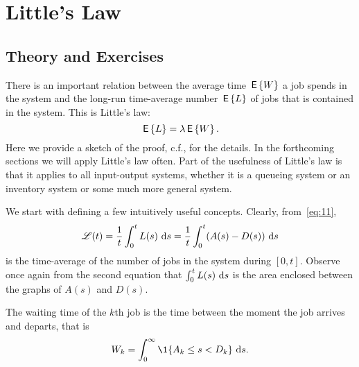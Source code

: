 \section{Little's Law}
\label{sec:littles-law}

\subsection*{Theory and Exercises}



There is an important relation between the average time $\,\mathsf{E}\left\{W\right\}$ a job
spends in the system and the long-run time-average number $\,\mathsf{E}\left\{L\right\}$ of jobs
that is contained in the system. This is Little's law:
\begin{equation}
  \,\mathsf{E}\left\{L\right\} = \lambda \,\mathsf{E}\left\{W\right\}.
\end{equation}
Here we provide a sketch of the proof, c.f.,
\cite{el-taha98:_sampl_path_analy_queuein_system} for the details. In
the forthcoming sections we will apply Little's law often. Part of the
usefulness of Little's law is that it applies to all input-output
systems, whether it is a queueing system or an inventory system or
some much more general system.

We start with defining a few intuitively useful concepts.  Clearly, from~\eqref{eq:11}, 
\begin{equation*}
  \mathscr{L}(t) = \frac 1 t\int_0^t L(s)\, \,\text{d}s =  \frac 1 t\int_0^t (A(s)-D(s)) \, \,\text{d}s
\end{equation*}
is the time-average of the number of jobs in the system during
$[0,t]$. Observe once again from the second equation that
$\int_0^t L(s)\,\,\text{d}s$ is the area enclosed between the graphs of $A(s)$
and $D(s)$.


The waiting time of the $k$th job is the time between the moment the
job arrives and departs, that is
\begin{equation*}
  W_k = \int_0^\infty \1{A_k \leq s < D_k}\,\d s.
\end{equation*}

